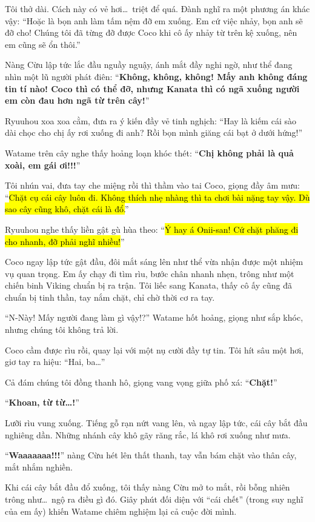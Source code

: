 \documentclass[../main.tex]{subfiles}
\begin{document}
Tôi thở dài. Cách này có vẻ hơi\dots\ triệt để quá. Đành nghĩ ra một phương án khác vậy: ``Hoặc là bọn anh làm tấm nệm đỡ em xuống. Em cứ việc nhảy, bọn anh sẽ đỡ cho! Chúng tôi đã từng đỡ được Coco khi cô ấy nhảy từ trên kệ xuống, nên em cũng sẽ ổn thôi.''

Nàng Cừu lập tức lắc đầu nguầy nguậy, ánh mắt đầy nghi ngờ, như thể đang nhìn một lũ người phát điên: ``\textbf{Không, không, không! Mấy anh không đáng tin tí nào! Coco thì có thể đỡ, nhưng Kanata thì có ngã xuống người em còn đau hơn ngã từ trên cây!}''

Ryuuhou xoa xoa cằm, đưa ra ý kiến đầy vẻ tinh nghịch: ``Hay là kiếm cái sào dài chọc cho chị ấy rơi xuống đi anh? Rồi bọn mình giăng cái bạt ở dưới hứng!''

Watame trên cây nghe thấy hoảng loạn khóc thét: ``\textbf{Chị không phải là quả xoài, em gái ơi!!!}''

Tôi nhún vai, đưa tay che miệng rồi thì thầm vào tai Coco, giọng đầy âm mưu: ``\hl{Chặt cụ cái cây luôn đi. Không thích nhẹ nhàng thì ta chơi bài nặng tay vậy. Dù sao cây cũng khô, chặt cái là đổ.}''

Ryuuhou nghe thấy liền gật gù hùa theo: ``\hl{Ý hay á Onii-san! Cứ chặt phăng đi cho nhanh, đỡ phải nghĩ nhiều!}''

Coco ngay lập tức gật đầu, đôi mắt sáng lên như thể vừa nhận được một nhiệm vụ quan trọng. Em ấy chạy đi tìm rìu, bước chân nhanh nhẹn, trông như một chiến binh Viking chuẩn bị ra trận. Tôi liếc sang Kanata, thấy cô ấy cũng đã chuẩn bị tinh thần, tay nắm chặt, chỉ chờ thời cơ ra tay.

``N-Này! Mấy người đang làm gì vậy!?'' Watame hốt hoảng, giọng như sắp khóc, nhưng chúng tôi không trả lời.

Coco cầm được rìu rồi, quay lại với một nụ cười đầy tự tin. Tôi hít sâu một hơi, giơ tay ra hiệu: ``Hai, ba\dots''

Cả đám chúng tôi đồng thanh hô, giọng vang vọng giữa phố xá: ``\textbf{Chặt!}''

``\textbf{Khoan, từ từ\dots!}''

Lưỡi rìu vung xuống. Tiếng gỗ rạn nứt vang lên, và ngay lập tức, cái cây bắt đầu nghiêng dần. Những nhánh cây khô gãy răng rắc, lá khô rơi xuống như mưa.

``\textbf{Waaaaaaa!!!}'' nàng Cừu hét lên thất thanh, tay vẫn bám chặt vào thân cây, mắt nhắm nghiền.

Khi cái cây bắt đầu đổ xuống, tôi thấy nàng Cừu mở to mắt, rồi bỗng nhiên trông như\dots\ ngộ ra điều gì đó. Giây phút đối diện với ``cái chết'' (trong suy nghĩ của em ấy) khiến Watame chiêm nghiệm lại cả cuộc đời mình.
\end{document}
